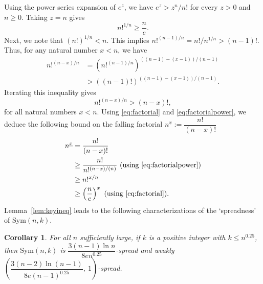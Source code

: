 \documentclass{amsart}
\newtheorem{cor}[thm]{Corollary}
\newcommand{\sym}{\mathrm{Sym}}
\newcommand{\ff}[1]{^{\underline{#1}}}
\begin{document}
Using the power series expansion of $e^z$, we have $e^z>z^n/n!$ for every $z>0$ and $n\geq 0$. Taking $z=n$ gives
\begin{equation}\label{eq:factorial}
  n!^{1/n} \geq \dfrac{n}{e}.   
\end{equation}
Next, we note that $(n!)^{1/n}<n$. This implies $n!^{(n-1)/n}=n!/n^{1/n}>(n-1)!$. Thus, for any natural number $x<n$, we have
\begin{align*}
n!^{(n-x)/n} &= \left(n!^{(n-1)/n} \right)^{((n-1)-(x-1))/(n-1)} \\
&> \left((n-1)!\right)^{((n-1)-(x-1))/(n-1)}.
\end{align*}
Iterating this inequality gives 
\begin{equation}\label{eq:factorialpower}
n!^{(n-x)/n} > (n-x)!,    
\end{equation}
for all natural numbers $x<n$. Using \eqref{eq:factorial} and \eqref{eq:factorialpower}, we deduce the following bound on the falling factorial $ n\ff{x}:=\dfrac{n!}{(n-x)!}$
\begin{align} \label{eq:fallingfact}
 n\ff{x} &= \dfrac{n!}{(n-x)!} \notag \\ 
& \geq \dfrac{n!}{n!^{(n-x)/(n)}}\ (\text{using \eqref{eq:factorialpower}}) \notag \\
& \geq n!^{x/n} \notag\\
& \geq \left( \dfrac{n}{e} \right)^{x} \ (\text{using \eqref{eq:factorial}}).    
\end{align}
Lemma~\ref{lem:keyineq} leads to the following characterizations of the `spreadness' of $\sym(n,k)$.
\begin{cor}\label{cor:spread}
For all $n$ sufficiently large, if $k$ is a positive integer with $k \leq n^{0.25}$, then $\sym(n,k)$ is $\dfrac{3(n-1)\ln n}{8e n^{0.25}}$-spread and weakly $\left(\dfrac{3(n-2)\ln(n-1)}{8e (n-1)^{0.25}},\ 1\right)$-spread.
\end{cor}
\end{document}
